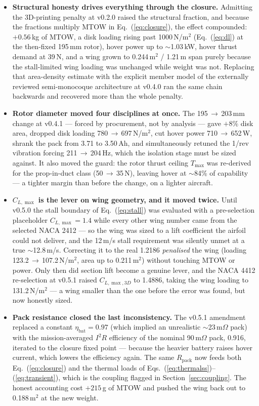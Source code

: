 \begin{itemize}[nosep]
\item \textbf{Structural honesty drives everything through the
  closure.} Admitting the 3D-printing penalty at v0.2.0 raised the
  structural fraction, and because the fractions multiply MTOW in
  Eq.~(\ref{eq:closure}), the effect compounded: $+0.56$\,kg of MTOW,
  a disk loading rising past 1000\,N/m$^2$
  (Eq.~(\ref{eq:dl}) at the then-fixed 195\,mm rotor), hover power up
  to $\sim$1.03\,kW, hover thrust demand at 39\,N, and a wing grown to
  0.244\,m$^2$ / 1.21\,m span purely because the stall-limited wing
  loading was unchanged while weight was not. Replacing that
  area-density estimate with the explicit member model of the
  externally reviewed semi-monocoque architecture at v0.4.0 ran the
  same chain backwards and recovered more than the whole penalty.
\item \textbf{Rotor diameter moved four disciplines at once.} The
  195\,$\rightarrow$\,203\,mm change at v0.4.1 --- forced by
  procurement, not by analysis --- gave $+8\%$ disk area, dropped disk
  loading 780\,$\rightarrow$\,697\,N/m$^2$, cut hover power
  710\,$\rightarrow$\,652\,W, shrank the pack from 3.71 to 3.50\,Ah,
  and simultaneously retuned the 1/rev vibration forcing
  211\,$\rightarrow$\,204\,Hz, which the isolation stage must be sized
  against. It also moved the guard: the rotor thrust ceiling
  $T_{\max}$ was re-derived for the prop-in-duct class
  (50\,$\rightarrow$\,35\,N), leaving hover at $\sim$84\% of capability
  --- a tighter margin than before the change, on a lighter aircraft.
\item \textbf{$C_{L,\max}$ is the lever on wing geometry, and it moved
  twice.} Until v0.5.0 the stall boundary of Eq.~(\ref{eq:stall}) was
  evaluated with a pre-selection placeholder
  $C_{L,\max}=1.4$ while every other wing number came from the selected
  NACA 2412 --- so the wing was sized to a lift coefficient the airfoil
  could not deliver, and the 12\,m/s stall requirement was silently
  unmet at a true $\sim$12.8\,m/s. Correcting it to the real 1.2186
  \emph{penalised} the wing (loading 123.2\,$\rightarrow$\,107.2\,N/m$^2$,
  area up to 0.211\,m$^2$) without touching MTOW or power. Only then
  did section lift become a genuine lever, and the NACA 4412
  re-selection at v0.5.1 raised $C_{L,\max,3D}$ to 1.4886, taking the
  wing loading to 131.2\,N/m$^2$ --- a wing smaller than the one before
  the error was found, but now honestly sized.
\item \textbf{Pack resistance closed the last inconsistency.} The
  v0.5.1 amendment replaced a constant $\eta_{\mathrm{bat}}=0.97$
  (which implied an unrealistic $\sim$23\,m$\Omega$ pack) with the
  mission-averaged $I^{2}R$ efficiency of the nominal 90\,m$\Omega$
  pack, 0.916, iterated to the closure fixed point --- because the
  heavier battery raises hover current, which lowers the efficiency
  again. The same $R_{\mathrm{pack}}$ now feeds both
  Eq.~(\ref{eq:closure}) and the thermal loads of
  Eqs.~(\ref{eq:thermalss})--(\ref{eq:transient}), which is the
  coupling flagged in Section~\ref{sec:coupling}. The honest accounting
  cost $+215$\,g of MTOW and pushed the wing back out to 0.188\,m$^2$
  at the new weight.
\end{itemize}

